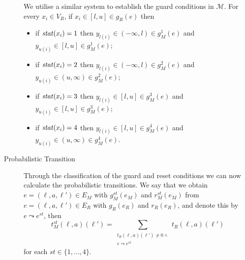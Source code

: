 \begin{description}
    We utilise a similar system to establish the guard conditions in $\mathcal{M}$. For every $x_{i}\in V_{R}$, if $x_{i}\in[l,u]\in g_{R}(e)$ then
        \begin{itemize}
            \item if $\mathit{stat}(x_{i})=1$ then $y_{l(i)}\in(-\infty,l)\in g_{M}^{1}(e)$ and $y_{u(i)}\in[l,u]\in g_{M}^{1}(e)$;
            \item if $\mathit{stat}(x_{i})=2$ then $y_{l(i)}\in(-\infty,l)\in g_{M}^{2}(e)$ and $y_{u(i)}\in(u,\infty)\in g_{M}^{2}(e)$;
            \item if $\mathit{stat}(x_{i})=3$ then $y_{l(i)}\in[l,u]\in g_{M}^{3}(e)$ and $y_{u(i)}\in[l,u]\in g_{M}^{3}(e)$;
            \item if $\mathit{stat}(x_{i})=4$ then $y_{l(i)}\in[l,u]\in g_{M}^{4}(e)$ and $y_{u(i)}\in(u,\infty)\in g_{M}^{4}(e)$.
        \end{itemize}

    \item[Probabilistic Transition] Through the classification of the guard and reset conditions we can now calculate the probabilistic transitions. We say that we obtain $e=(\ell,a,\ell')\in E_{M}$ with $g_{M}^{st}(e_{M})$ and $r_{M}^{st}(e_{M})$ from $e=(\ell,a,\ell')\in E_{R}$ with $g_{R}(e_{R})$ and $r_{R}(e_{R})$, and denote this by $e\leadsto e^{st}$, then
    \[
    t_{M}^{st}(\ell,a)(\ell') = \sum_{\substack{t_{R}(\ell,a)(\ell')\neq0 \land\\ e\leadsto e^{st}}} t_{R}(\ell,a)(\ell')
    \]
    for each $st\in\{1,\ldots,4\}$.
\end{description}



